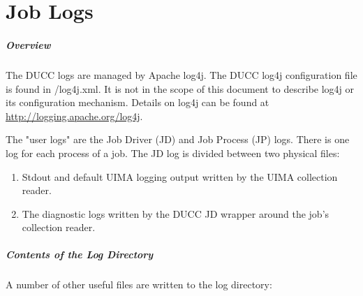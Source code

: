 % 
% 
% 
% 
\ifpdf
\else
{}
\fi
\chapter{Job Logs}
\label{chap:job-logs}

\paragraph{Overview}The DUCC logs are managed by Apache log4j.  The DUCC log4j configuration file is found in
\duccruntime/log4j.xml. It is not in the scope of this document to describe log4j or its
configuration mechanism. Details on log4j can be found at \url{http://logging.apache.org/log4j}.

The "user logs" are the Job Driver (JD) and Job Process (JP) logs. There is one log for each process 
of a job. The JD log is divided between two physical files: 

\begin{enumerate}
   \item Stdout and default UIMA logging output written by the UIMA collection reader.      
   \item The diagnostic logs written by the DUCC JD wrapper around the job's collection reader. 
\end{enumerate}

\paragraph{Contents of the Log Directory} A number of other useful files are written to the log directory: 

